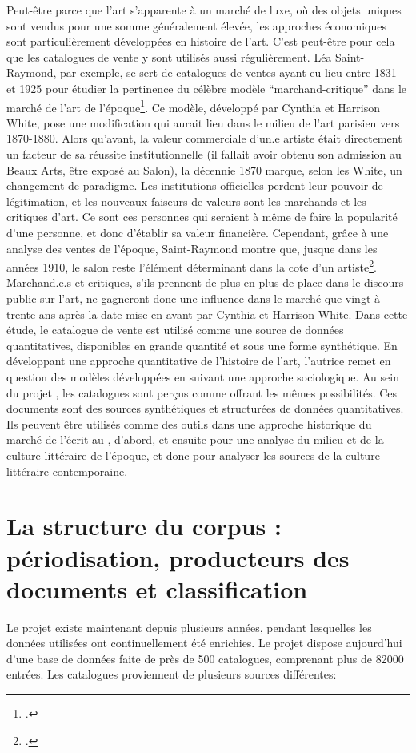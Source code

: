 Peut-être parce que l'art s'apparente à un marché de luxe, où des objets uniques sont vendus pour une somme généralement élevée, les approches économiques sont particulièrement développées en histoire de l'art. C'est peut-être pour cela que les catalogues de vente y sont utilisés aussi régulièrement. Léa Saint-Raymond, par exemple, se sert de catalogues de ventes ayant eu lieu entre 1831 et 1925 pour étudier la pertinence du célèbre modèle \enquote{marchand-critique} dans le marché de l'art de l'époque\footcite{saint-raymond_revisiting_2019}. Ce modèle, développé par Cynthia et Harrison White, pose une modification qui aurait lieu dans le milieu de l'art parisien vers 1870-1880. Alors qu'avant, la valeur commerciale d'un.e artiste était directement un facteur de sa réussite institutionnelle (il fallait avoir obtenu son admission au Beaux Arts, être exposé au Salon), la décennie 1870 marque, selon les White, un changement de paradigme. Les institutions officielles perdent leur pouvoir de légitimation, et les nouveaux faiseurs de valeurs sont les marchands et les critiques d'art. Ce sont ces personnes qui seraient à même de faire la popularité d'une personne, et donc d'établir sa valeur financière. Cependant, grâce à une analyse des ventes de l'époque, Saint-Raymond montre que, jusque dans les années 1910, le salon reste l'élément déterminant dans la cote d'un artiste\footcite[p. 6-16]{saint-raymond_revisiting_2019}. Marchand.e.s et critiques, s'ils prennent de plus en plus de place dans le discours public sur l'art, ne gagneront donc une influence dans le marché que vingt à trente ans après la date mise en avant par Cynthia et Harrison White. Dans cette étude, le catalogue de vente est utilisé comme une source de données quantitatives, disponibles en grande quantité et sous une forme synthétique. En développant une approche quantitative de l'histoire de l'art, l'autrice remet en question des modèles développées en suivant une approche sociologique. Au sein du projet \mssktb{}, les catalogues sont perçus comme offrant les mêmes possibilités. Ces documents sont des sources synthétiques et structurées de données quantitatives. Ils peuvent être utilisés comme des outils dans une approche historique du marché de l'écrit au , d'abord, et ensuite pour une analyse du milieu et de la culture littéraire de l'époque, et donc pour analyser les sources de la culture littéraire contemporaine.


\section{La structure du corpus : périodisation, producteurs des documents et classification}
Le projet \mssktb{} existe maintenant depuis plusieurs années, pendant lesquelles les données utilisées ont continuellement été enrichies. Le projet dispose aujourd'hui d'une base de données faite de près de 500 catalogues, comprenant plus de 82000 entrées. Les catalogues proviennent de plusieurs sources différentes:

